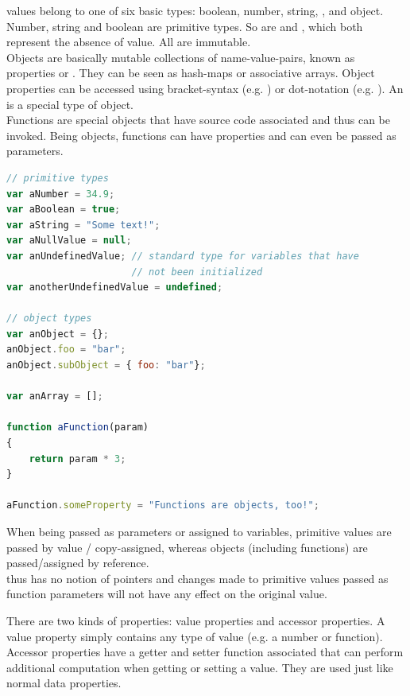  values belong to one of six basic types: boolean, number, string, ,  and object.\\
Number, string and boolean are primitive types. So are  and , which both represent the absence of value. All are immutable.\\
Objects are basically mutable collections of name-value-pairs, known as properties or . They can be seen as hash-maps or associative arrays. Object properties can be accessed using bracket-syntax (e.g. ) or dot-notation (e.g. ). An  is a special type of  object.\\
Functions are special objects that have source code associated and thus can be invoked. Being objects, functions can have properties and can even be passed as parameters.

\SingleSpacing
\begin{lstlisting}[language=JavaScript, caption=Types in \myProperName{JavaScript}]
// primitive types
var aNumber = 34.9;
var aBoolean = true;
var aString = "Some text!";
var aNullValue = null;
var anUndefinedValue; // standard type for variables that have 
                      // not been initialized
var anotherUndefinedValue = undefined;

// object types
var anObject = {};
anObject.foo = "bar";
anObject.subObject = { foo: "bar"};

var anArray = [];

function aFunction(param)
{
	return param * 3;
}

aFunction.someProperty = "Functions are objects, too!";
\end{lstlisting}
\OnehalfSpacing

When being passed as parameters or assigned to variables, primitive values are passed by value / copy-assigned, whereas objects (including functions) are passed/assigned by reference.\\
 thus has no notion of pointers and changes made to primitive values passed as function parameters will not have any effect on the original value.

There are two kinds of properties: value properties and accessor properties. A value property simply contains any type of value (e.g. a number or function). Accessor properties have a getter and setter function associated that can perform additional computation when getting or setting a value. They are used just like normal data properties.

